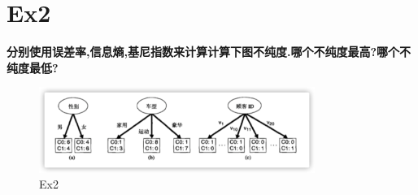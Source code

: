 \label{key}\documentclass[UTF8,a4paper,11pt]{ctexart}
\begin{document}
\section{Ex2}
\textbf{分别使用误差率,信息熵,基尼指数来计算计算下图不纯度.哪个不纯度最高?哪个不纯度最低?}
\begin{figure}[H]
	\centering
	\includegraphics[width=0.8\textwidth,height=0.4\textwidth]{Ex2.png}
	\caption{Ex2}
\end{figure}
\end{document}
